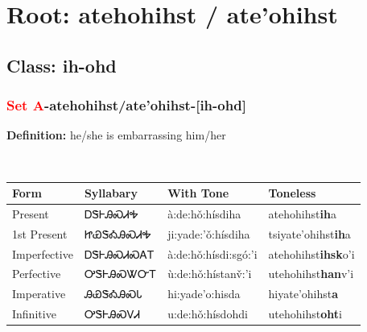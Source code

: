 \needspace{4in}
\section*{Root: atehohihst / ate'ohihst}
\nopagebreak
{}
\needspace{3in}
\subsection*{Class: ih-ohd}
\nopagebreak
\needspace{2in}
\subsubsection*{\textcolor{Red}{Set A}{-}\textbf{atehohihst/ate'ohihst}{-}[ih-ohd]}
\nopagebreak
\textbf{Definition: } he/she is embarrassing him/her
\\[0.5em]
\begin{tabularx}{\textwidth}{l X X X}%
\toprule%
\textbf{Form}&\textbf{Syllabary}&\textbf{With Tone}&\textbf{Toneless}\\%
\midrule%
Present&ᎠᏕᎰᎯᏍᏗᎭ&à:de:hǒ:hísdiha&atehohihst\textbf{ih}a\\%
1st Present&ᏥᏯᏕᎣᎯᏍᏗᎭ&ji:yade:’ǒ:hísdiha&tsiyate'ohihst\textbf{ih}a\\%
Imperfective&ᎠᏕᎰᎯᏍᏗᏍᎪᎢ&à:de:hǒ:hísdi:sgó:’i&atehohihst\textbf{ihsk}o'i\\%
Perfective&ᎤᏕᎰᎯᏍᏔᏅᎢ&ù:de:hǒ:hístanv̌:’i&utehohihst\textbf{han}v'i\\%
Imperative&ᎯᏯᏕᎣᎯᏍᏓ&hi:yade’o:hisda&hiyate'ohihst\textbf{a}\\%
Infinitive&ᎤᏕᎰᎯᏍᏙᏗ&u:de:hǒ:hísdohdi&utehohihst\textbf{oht}i\\%
\bottomrule%
\end{tabularx}
\\[1em]